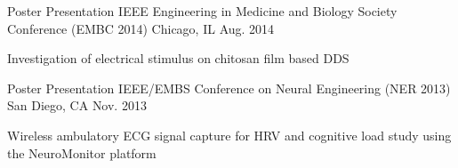 \begin{cventries}
{\begin{cvitems}
      \end{cvitems}
    }
    \cventry
    {Poster Presentation}
    {IEEE Engineering in Medicine and Biology Society Conference (EMBC 2014)}
    {Chicago, IL}
    {Aug. 2014}
    {
      \begin{cvitems}
        \item {Investigation of electrical stimulus on chitosan film based DDS}
      \end{cvitems}
    }
    \cventry
    {Poster Presentation}
    {IEEE/EMBS Conference on Neural Engineering (NER 2013)}
    {San Diego, CA}
    {Nov. 2013}
    {
      \begin{cvitems}
        \item {Wireless ambulatory ECG signal capture for HRV and cognitive load study using the NeuroMonitor platform}
      \end{cvitems}
    }
\end{cventries}
